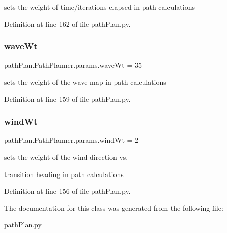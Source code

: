 sets the weight of time/iterations elapsed in path calculations 



Definition at line 162 of file path\+Plan.\+py.

\mbox{\label{classpath_plan_1_1_path_planner_1_1params_aa33ac57c3fbbe451c9e8a7a34b237eee}} 
\subsubsection{\texorpdfstring{wave\+Wt}{waveWt}}
{\footnotesize\ttfamily path\+Plan.\+Path\+Planner.\+params.\+wave\+Wt = 35\hspace{0.3cm}{\ttfamily [static]}}



sets the weight of the wave map in path calculations 



Definition at line 159 of file path\+Plan.\+py.

\mbox{\label{classpath_plan_1_1_path_planner_1_1params_a0aafe9db7a80b4f22c7e2ad577b8daff}} 
\subsubsection{\texorpdfstring{wind\+Wt}{windWt}}
{\footnotesize\ttfamily path\+Plan.\+Path\+Planner.\+params.\+wind\+Wt = 2\hspace{0.3cm}{\ttfamily [static]}}



sets the weight of the wind direction vs. 

transition heading in path calculations 

Definition at line 156 of file path\+Plan.\+py.



The documentation for this class was generated from the following file\+:\begin{DoxyCompactItemize}
\item 
\mbox{\hyperlink{path_plan_8py}{path\+Plan.\+py}}\end{DoxyCompactItemize}
